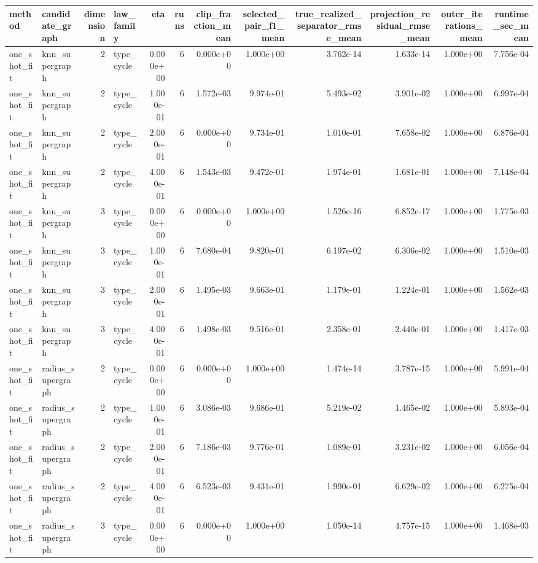 \begin{tabular}{llrlrrrrrrrr}
\toprule
method & candidate_graph & dimension & law_family & eta & runs & clip_fraction_mean & selected_pair_f1_mean & true_realized_separator_rmse_mean & projection_residual_rmse_mean & outer_iterations_mean & runtime_sec_mean \\
\midrule
one_shot_fit & knn_supergraph & 2 & type_cycle & 0.000e+00 & 6 & 0.000e+00 & 1.000e+00 & 3.762e-14 & 1.633e-14 & 1.000e+00 & 7.756e-04 \\
one_shot_fit & knn_supergraph & 2 & type_cycle & 1.000e-01 & 6 & 1.572e-03 & 9.974e-01 & 5.493e-02 & 3.901e-02 & 1.000e+00 & 6.997e-04 \\
one_shot_fit & knn_supergraph & 2 & type_cycle & 2.000e-01 & 6 & 0.000e+00 & 9.734e-01 & 1.010e-01 & 7.658e-02 & 1.000e+00 & 6.876e-04 \\
one_shot_fit & knn_supergraph & 2 & type_cycle & 4.000e-01 & 6 & 1.543e-03 & 9.472e-01 & 1.974e-01 & 1.681e-01 & 1.000e+00 & 7.148e-04 \\
one_shot_fit & knn_supergraph & 3 & type_cycle & 0.000e+00 & 6 & 0.000e+00 & 1.000e+00 & 1.526e-16 & 6.852e-17 & 1.000e+00 & 1.775e-03 \\
one_shot_fit & knn_supergraph & 3 & type_cycle & 1.000e-01 & 6 & 7.680e-04 & 9.820e-01 & 6.197e-02 & 6.306e-02 & 1.000e+00 & 1.510e-03 \\
one_shot_fit & knn_supergraph & 3 & type_cycle & 2.000e-01 & 6 & 1.495e-03 & 9.663e-01 & 1.179e-01 & 1.224e-01 & 1.000e+00 & 1.562e-03 \\
one_shot_fit & knn_supergraph & 3 & type_cycle & 4.000e-01 & 6 & 1.498e-03 & 9.516e-01 & 2.358e-01 & 2.440e-01 & 1.000e+00 & 1.417e-03 \\
one_shot_fit & radius_supergraph & 2 & type_cycle & 0.000e+00 & 6 & 0.000e+00 & 1.000e+00 & 1.474e-14 & 3.787e-15 & 1.000e+00 & 5.991e-04 \\
one_shot_fit & radius_supergraph & 2 & type_cycle & 1.000e-01 & 6 & 3.086e-03 & 9.686e-01 & 5.219e-02 & 1.465e-02 & 1.000e+00 & 5.893e-04 \\
one_shot_fit & radius_supergraph & 2 & type_cycle & 2.000e-01 & 6 & 7.186e-03 & 9.776e-01 & 1.089e-01 & 3.231e-02 & 1.000e+00 & 6.056e-04 \\
one_shot_fit & radius_supergraph & 2 & type_cycle & 4.000e-01 & 6 & 6.523e-03 & 9.431e-01 & 1.990e-01 & 6.629e-02 & 1.000e+00 & 6.275e-04 \\
one_shot_fit & radius_supergraph & 3 & type_cycle & 0.000e+00 & 6 & 0.000e+00 & 1.000e+00 & 1.050e-14 & 4.757e-15 & 1.000e+00 & 1.468e-03 \\

\end{tabular}
